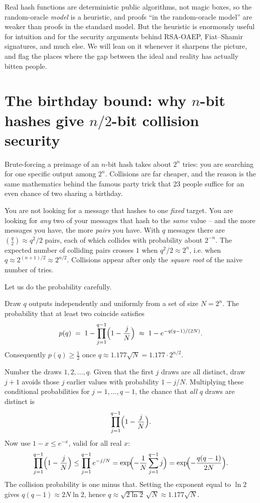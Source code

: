 Real hash functions are deterministic public algorithms, not magic boxes, so the random-oracle \emph{model} is a heuristic, and proofs ``in the random-oracle model'' are weaker than proofs in the standard model. But the heuristic is enormously useful for intuition and for the security arguments behind RSA-OAEP, Fiat--Shamir signatures, and much else. We will lean on it whenever it sharpens the picture, and flag the places where the gap between the ideal and reality has actually bitten people.

\section{The birthday bound: why $n$-bit hashes give $n/2$-bit collision security}
\label{ch14:birthday}

Brute-forcing a preimage of an $n$-bit hash takes about $2^{n}$ tries: you are searching for one specific output among $2^{n}$. Collisions are far cheaper, and the reason is the same mathematics behind the famous party trick that 23 people suffice for an even chance of two sharing a birthday.

\begin{intuitionbox}
You are not looking for a message that hashes to one \emph{fixed} target. You are looking for \emph{any} two of your messages that hash to the \emph{same} value -- and the more messages you have, the more \emph{pairs} you have. With $q$ messages there are $\binom{q}{2} \approx q^{2}/2$ pairs, each of which collides with probability about $2^{-n}$. The expected number of colliding pairs crosses $1$ when $q^{2}/2 \approx 2^{n}$, i.e. when $q \approx 2^{(n+1)/2} \approx 2^{n/2}$. Collisions appear after only the \emph{square root} of the naive number of tries.
\end{intuitionbox}

Let us do the probability carefully.

\begin{theorem}
\label{ch14:thm-birthday}
Draw $q$ outputs independently and uniformly from a set of size $N = 2^{n}$. The probability that at least two coincide satisfies
\[
  p(q) \;=\; 1 - \prod_{j=1}^{q-1}\Bigl(1 - \frac{j}{N}\Bigr)
        \;\approx\; 1 - e^{-q(q-1)/(2N)}.
\]
Consequently $p(q) \ge \tfrac12$ once $q \approx 1.177\sqrt{N} = 1.177 \cdot 2^{n/2}$.
\end{theorem}

\begin{whybox}
Number the draws $1, 2, \dots, q$. Given that the first $j$ draws are all distinct, draw $j+1$ avoids those $j$ earlier values with probability $1 - j/N$. Multiplying these conditional probabilities for $j = 1, \dots, q-1$, the chance that \emph{all} $q$ draws are distinct is
\[
  \prod_{j=1}^{q-1}\Bigl(1 - \frac{j}{N}\Bigr).
\]
Now use $1 - x \le e^{-x}$, valid for all real $x$:
\[
  \prod_{j=1}^{q-1}\Bigl(1 - \frac{j}{N}\Bigr)
   \le \prod_{j=1}^{q-1} e^{-j/N}
   = \exp\!\Bigl(-\frac{1}{N}\sum_{j=1}^{q-1} j\Bigr)
   = \exp\!\Bigl(-\frac{q(q-1)}{2N}\Bigr).
\]
The collision probability is one minus that. Setting the exponent equal to $\ln 2$ gives $q(q-1) \approx 2N\ln 2$, hence $q \approx \sqrt{2\ln 2}\,\sqrt{N} \approx 1.177\sqrt{N}$.
\end{whybox}


